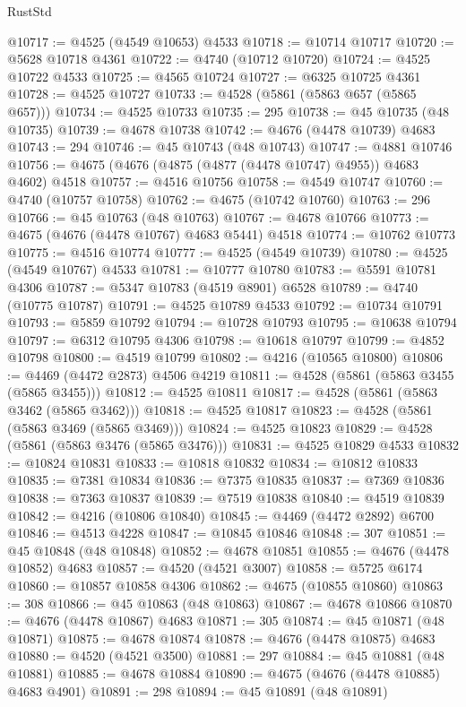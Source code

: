 \begin{lexlean}{RustStd}
\begin{coremodule}
@10717 := @4525 (@4549 @10653) @4533
@10718 := @10714 @10717
@10720 := @5628 @10718 @4361
@10722 := @4740 (@10712 @10720)
@10724 := @4525 @10722 @4533
@10725 := @4565 @10724
@10727 := @6325 @10725 @4361
@10728 := @4525 @10727
@10733 := @4528 (@5861 (@5863 @657 (@5865 @657)))
@10734 := @4525 @10733
@10735 := 295
@10738 := @45 @10735 (@48 @10735)
@10739 := @4678 @10738
@10742 := @4676 (@4478 @10739) @4683
@10743 := 294
@10746 := @45 @10743 (@48 @10743)
@10747 := @4881 @10746
@10756 := @4675 (@4676 (@4875 (@4877 (@4478 @10747) @4955)) @4683 @4602) @4518
@10757 := @4516 @10756
@10758 := @4549 @10747
@10760 := @4740 (@10757 @10758)
@10762 := @4675 (@10742 @10760)
@10763 := 296
@10766 := @45 @10763 (@48 @10763)
@10767 := @4678 @10766
@10773 := @4675 (@4676 (@4478 @10767) @4683 @5441) @4518
@10774 := @10762 @10773
@10775 := @4516 @10774
@10777 := @4525 (@4549 @10739)
@10780 := @4525 (@4549 @10767) @4533
@10781 := @10777 @10780
@10783 := @5591 @10781 @4306
@10787 := @5347 @10783 (@4519 @8901) @6528
@10789 := @4740 (@10775 @10787)
@10791 := @4525 @10789 @4533
@10792 := @10734 @10791
@10793 := @5859 @10792
@10794 := @10728 @10793
@10795 := @10638 @10794
@10797 := @6312 @10795 @4306
@10798 := @10618 @10797
@10799 := @4852 @10798
@10800 := @4519 @10799
@10802 := @4216 (@10565 @10800)
@10806 := @4469 (@4472 @2873) @4506 @4219
@10811 := @4528 (@5861 (@5863 @3455 (@5865 @3455)))
@10812 := @4525 @10811
@10817 := @4528 (@5861 (@5863 @3462 (@5865 @3462)))
@10818 := @4525 @10817
@10823 := @4528 (@5861 (@5863 @3469 (@5865 @3469)))
@10824 := @4525 @10823
@10829 := @4528 (@5861 (@5863 @3476 (@5865 @3476)))
@10831 := @4525 @10829 @4533
@10832 := @10824 @10831
@10833 := @10818 @10832
@10834 := @10812 @10833
@10835 := @7381 @10834
@10836 := @7375 @10835
@10837 := @7369 @10836
@10838 := @7363 @10837
@10839 := @7519 @10838
@10840 := @4519 @10839
@10842 := @4216 (@10806 @10840)
@10845 := @4469 (@4472 @2892) @6700
@10846 := @4513 @4228
@10847 := @10845 @10846
@10848 := 307
@10851 := @45 @10848 (@48 @10848)
@10852 := @4678 @10851
@10855 := @4676 (@4478 @10852) @4683
@10857 := @4520 (@4521 @3007)
@10858 := @5725 @6174
@10860 := @10857 @10858 @4306
@10862 := @4675 (@10855 @10860)
@10863 := 308
@10866 := @45 @10863 (@48 @10863)
@10867 := @4678 @10866
@10870 := @4676 (@4478 @10867) @4683
@10871 := 305
@10874 := @45 @10871 (@48 @10871)
@10875 := @4678 @10874
@10878 := @4676 (@4478 @10875) @4683
@10880 := @4520 (@4521 @3500)
@10881 := 297
@10884 := @45 @10881 (@48 @10881)
@10885 := @4678 @10884
@10890 := @4675 (@4676 (@4478 @10885) @4683 @4901)
@10891 := 298
@10894 := @45 @10891 (@48 @10891)

\end{coremodule}
\end{lexlean}
